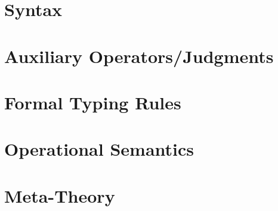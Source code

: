 \section{Syntax}


\section{Auxiliary Operators/Judgments}


\section{Formal Typing Rules}


\section{Operational Semantics}\label{appendix:semantics}


\section{Meta-Theory}\label{appendix:metatheory}
